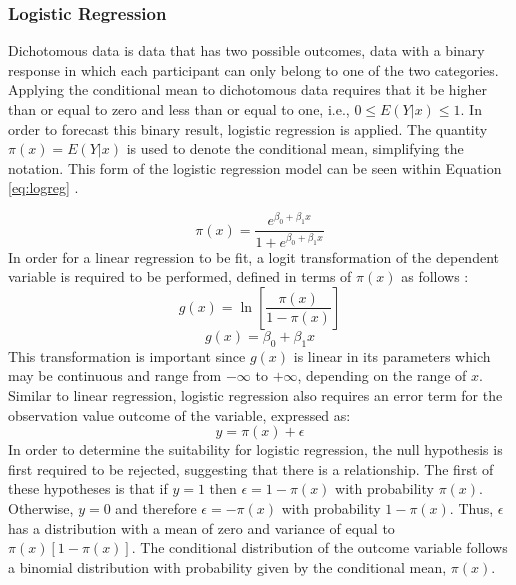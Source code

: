 \documentclass[../thesis.tex]{subfiles}
\begin{document}
\subsubsection{Logistic Regression}
Dichotomous data is data that has two possible outcomes, data with a binary response in which each participant can only belong to one of the two categories. Applying the conditional mean to dichotomous data requires that it be higher than or equal to zero and less than or equal to one, i.e., $ 0 \leq E(Y|x) \leq 1$. In order to forecast this binary result, logistic regression is applied. The quantity $\pi(x) = E(Y|x)$ is used to denote the conditional mean, simplifying the notation. This form of the logistic regression model can be seen within Equation \eqref{eq:logreg} \cite{Hosmer1989,Wasserman2004}.

\begin{equation}\label{eq:logreg}
    \pi(x) = \frac{e^{\beta_{0}+\beta_{1}x}}{1 +e^{\beta_{0}+\beta_{1}x}}
\end{equation}
In order for a linear regression to be fit, a logit transformation of the dependent variable is required to be performed, defined in terms of $\pi(x)$ as follows \cite{Hosmer1989}:
\begin{equation}
    g(x) = \ln \left[ \frac{\pi(x)}{1 - \pi(x)}
    \right]
\end{equation}
\begin{equation}\label{eq:logreg1}
    g(x) = \beta_{0} +\beta_{1}x
\end{equation}
This transformation is important since $g(x)$ is linear in its parameters which may be continuous and range from $-\infty$ to $+\infty$, depending on the range of $x$.
Similar to linear regression, logistic regression also requires an error term for the observation value outcome of the variable, expressed as:
\begin{equation}
    y = \pi(x) + \epsilon
\end{equation}
In order to determine the suitability for logistic regression, the null hypothesis is first required to be rejected, suggesting that there is a relationship. The first of these hypotheses is that if $y = 1$ then $\epsilon = 1 - \pi(x)$ with probability $\pi(x)$. Otherwise, $y=0$ and therefore $\epsilon = -\pi(x)$ with probability $ 1- \pi(x)$. Thus, $\epsilon$ has a distribution with a mean of zero and variance of equal to $\pi(x)[1-\pi(x)]$. The conditional distribution of the outcome variable follows a binomial distribution with probability given by the conditional mean, $\pi(x)$.
\end{document}
